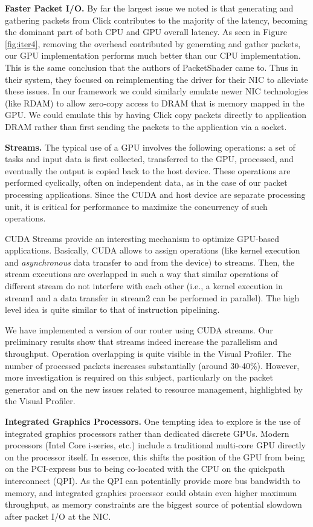 \medskip \noindent \textbf{Faster Packet I/O.} By far the largest issue we noted
is that generating and gathering packets from Click contributes to the majority
of the latency, becoming the dominant part of both CPU and GPU overall
latency. As seen in Figure \ref{fig:iter4}, removing the overhead contributed by
generating and gather packets, our GPU implementation performs much better than
our CPU implementation. This is the same conclusion that the authors of
PacketShader \cite{Han} came to. Thus in their system, they focused on
reimplementing the driver for their NIC to alleviate these issues. In our
framework we could similarly emulate newer NIC technologies (like RDAM) to allow
zero-copy access to DRAM that is memory mapped in the GPU. We could emulate this
by having Click copy packets directly to application DRAM rather than first
sending the packets to the application via a socket.

\medskip \noindent \textbf{Streams.} The typical use of a GPU involves the
following operations: a set of tasks and input data is first collected,
transferred to the GPU, processed, and eventually the output is copied back to
the host device. These operations are performed cyclically, often on
independent data, as in the case of our packet processing applications. Since
the CUDA and host device are separate processing unit, it is critical for
performance to maximize the concurrency of such operations.

CUDA Streams provide an interesting mechanism to optimize GPU-based
applications. Basically, CUDA allows to assign operations (like kernel
execution and \emph{asynchronous} data transfer to and from the device) to
streams. Then, the stream executions are overlapped in such a way that similar
operations of different stream do not interfere with each other (i.e., a kernel
execution in stream1 and a data transfer in stream2 can be performed in
parallel). The high level idea is quite similar to that of instruction
pipelining.

We have implemented a version of our router using CUDA streams. Our preliminary
results show that streams indeed increase the parallelism and throughput.
Operation overlapping is quite visible in the Visual Profiler. The number of
processed packets increases substantially (around 30-40\%). However, more
investigation is required on this subject, particularly on the packet generator
and on the new issues related to resource management, highlighted by the Visual
Profiler.


\medskip \noindent \textbf{Integrated Graphics Processors.} One tempting idea
to explore is the use of integrated graphics processors rather than dedicated
discrete GPUs. Modern processors (Intel Core i-series, etc.) include a
traditional multi-core GPU directly on the processor itself. In essence, this
shifts the position of the GPU from being on the PCI-express bus to being
co-located with the CPU on the quickpath interconnect (QPI). As the QPI can
potentially provide more bus bandwidth to memory, and integrated graphics
processor could obtain even higher maximum throughput, as memory constraints
are the biggest source of potential slowdown after packet I/O at the NIC.
